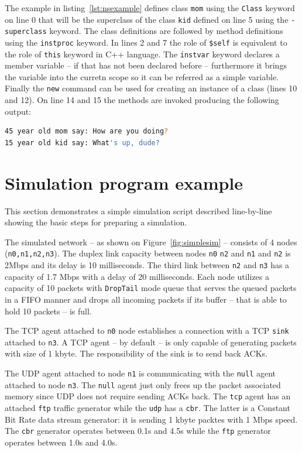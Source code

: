 \documentclass[a4paper]{article}
\begin{document}
The example in listing~\ref{lst:nsexample} defines class \verb!mom! using the \verb!Class! keyword on 
line 0 that will be the superclass of the class \verb!kid! defined on line 5 using the
\verb!-superclass! keyword. The class definitions are followed by method definitions using the
\verb!instproc! keyword. In lines 2 and 7 the role of \verb!$self! is equivalent to the role of
\verb!this! keyword in C++ language. The \verb!instvar! keyword declares a member variable -- if
that has not been declared before -- furthermore it brings the variable into the curretn scope so it can be referred as a
simple variable. Finally the \verb!new! command can be used for creating an instance of a class (lines 10 and
12). On line 14 and 15 the methods are invoked producing the following output:
\begin{lstlisting}[language=bash]
45 year old mom say: How are you doing?
15 year old kid say: What's up, dude?
\end{lstlisting}

\section{Simulation program example}

This section demonstrates a simple simulation script described line-by-line showing the basic steps for preparing a
simulation.

The simulated network -- as shown on Figure~\ref{fig:simplesim} -- consists of 4 nodes (\verb!n0,n1,n2,n3!). The
duplex link capacity between nodes \verb!n0! \verb!n2! and \verb!n1! and
\verb!n2! is 2Mbps and its delay is 10 milliseconds. The third link between \verb!n2! and
\verb!n3! has a capacity of 1.7 Mbps with a delay of 20 milliseconds. Each node utilizes a  capacity of 10 packets
with \verb!DropTail! mode queue that serves the queued packets in a FIFO manner and drops all incoming
packets if its buffer -- that is able to hold 10 packets -- is full.

The TCP agent attached to \verb!n0! node establishes a connection with a TCP \verb!sink!
attached to \verb!n3!. A TCP agent -- by default -- is only capable of generating packets with size of 1
kbyte. The responsibility of the sink is to send back ACKs.

The UDP agent attached to node \verb!n1! is communicating with the \verb!null! agent attached
to node \verb!n3!. The \verb!null! agent just only frees up the packet associated memory
since UDP does not require sending ACKs back. The \verb!tcp! agent has an attached \verb!ftp!
traffic generator while the \verb!udp! has a \verb!cbr!. The latter is a Constant Bit Rate
data stream generator: it is sending 1 kbyte packtes with 1 Mbps speed. The \verb!cbr! generator operates
between 0.1s and 4.5s while the \verb!ftp! generator operates between 1.0s and 4.0s.
\end{document}
